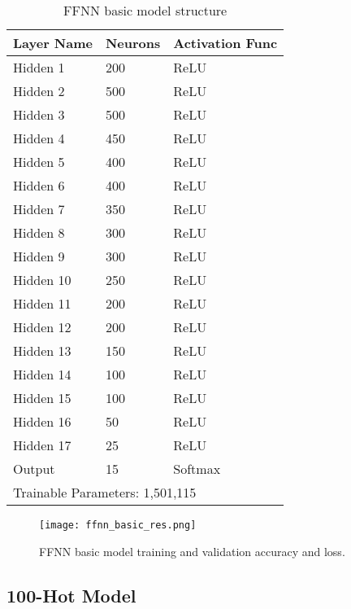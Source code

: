 \documentclass[11pt,a4paper]{article}
\begin{document}
\begin{table}[!h]
\centering
\caption{FFNN basic model structure}
\label{tab:ffnn_basic}
\begin{tabular}{|l|l|l|}
\hline
Layer Name & Neurons & Activation Func \\ \hline
Hidden 1 & 200 & ReLU \\ \hline
Hidden 2 & 500 & ReLU \\ \hline
Hidden 3 & 500 & ReLU \\ \hline
Hidden 4 & 450 & ReLU \\ \hline
Hidden 5 & 400 & ReLU \\ \hline
Hidden 6 & 400 & ReLU \\ \hline
Hidden 7 & 350 & ReLU \\ \hline
Hidden 8 & 300 & ReLU \\ \hline
Hidden 9 & 300 & ReLU \\ \hline
Hidden 10 & 250 & ReLU \\ \hline
Hidden 11 & 200 & ReLU \\ \hline
Hidden 12 & 200 & ReLU \\ \hline
Hidden 13 & 150 & ReLU \\ \hline
Hidden 14 & 100 & ReLU \\ \hline
Hidden 15 & 100 & ReLU \\ \hline
Hidden 16 & 50 & ReLU \\ \hline
Hidden 17 & 25 & ReLU \\ \hline
Output & 15 & Softmax \\ \hline
\multicolumn{3}{|l|}{Trainable Parameters: 1,501,115} \\ \hline
\end{tabular}
\end{table}


\begin{figure}[!h]
    \centering
    \texttt{[image: ffnn\_basic\_res.png]}
    \caption{FFNN basic model training and validation accuracy and loss.}
    \label{fig:ffnn_basic_res}
\end{figure}

\subsection{100-Hot Model}
\end{document}
